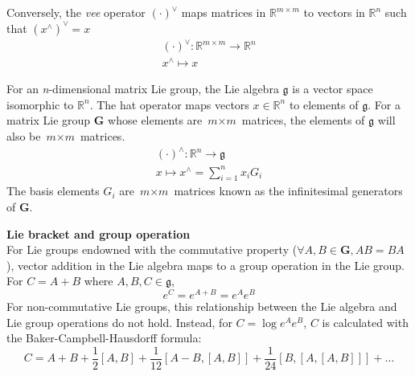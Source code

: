 			Conversely, the \textit{vee} operator $(\cdot)^{\vee}$ maps matrices in $\mathbb{R}^{m \times m}$ to vectors in $\mathbb{R}^n$ such that ${(x^{\wedge})}^{\vee} = x$
			\begin{equation}
				\begin{split}
					(\cdot)^{\vee}: \mathbb{R}^{m \times m} \rightarrow \mathbb{R}^n\\
					x^{\wedge} \mapsto x
				\end{split}
			\end{equation}
		
			For an \textit{n}-dimensional matrix Lie group, the Lie algebra $\mathfrak{g}$ is a vector space isomorphic to $\mathbb{R}^n$. The hat operator maps vectors $x \in \mathbb{R}^n$ to elements of $\mathfrak{g}$.	For a matrix Lie group $\mathbf{G}$ whose elements are $\textit{m} \times \textit{m}$ matrices, the elements of $\mathfrak{g}$ will also be $\textit{m} \times \textit{m}$ matrices.		
			\begin{equation}
				\begin{split}
					(\cdot)^{\wedge}:\mathbb{R}^n \rightarrow \mathfrak{g}\\
					x \mapsto x^{\wedge} = \sum\limits_{i=1}^n x_iG_i 
				\end{split}
			\end{equation}
			The basis elements $G_i$ are $\textit{m} \times \textit{m}$ matrices known as the infinitesimal generators of $\mathbf{G}$.
									
		\textbf{Lie bracket and group operation}\\					
			For Lie groups endowned with the commutative property ($\forall A,B \in \mathbf{G}, AB = BA$), vector addition in the Lie algebra maps to a group operation in the Lie group. For $C = A + B$ where $A,B,C \in \mathfrak{g}$,
			\begin{equation}
				e^C = e^{A+B} = e^Ae^B
			\end{equation}
			For non-commutative Lie groups, this relationship between the Lie algebra and Lie group operations do not hold. Instead, for $C = \log{e^Ae^B}$, $C$ is calculated with the Baker-Campbell-Hausdorff formula:
			\begin{equation}
				C = A + B + \frac{1}{2}[A,B] + \frac{1}{12}[A-B,[A,B]] + \frac{1}{24}[B,[A,[A,B]]] + \dots
			\end{equation}	
		
